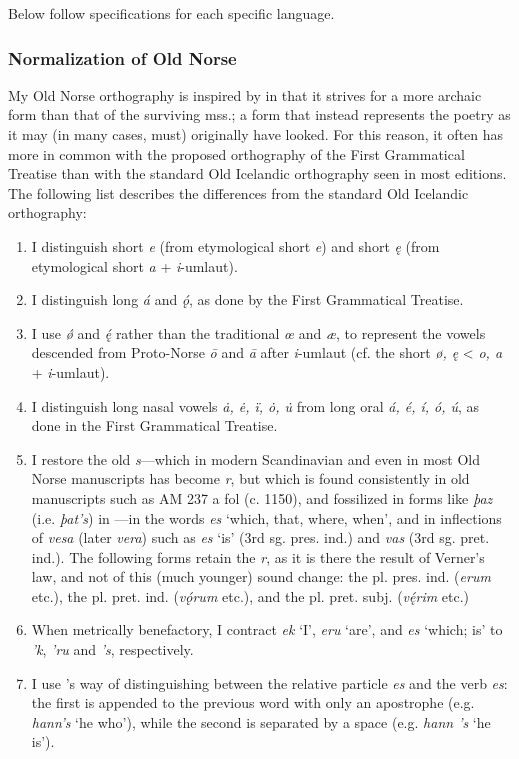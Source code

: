     Below follow specifications for each specific language.

    \subsubsection{Normalization of Old Norse}

    My Old Norse orthography is inspired by \textcite{FinnurEdda} in that it strives for a more archaic form than that of the surviving mss.; a form that instead represents the poetry as it may (in many cases, must) originally have looked. For this reason, it often has more in common with the proposed orthography of the First Grammatical Treatise than with the standard Old Icelandic orthography seen in most editions. The following list describes the differences from the standard Old Icelandic orthography:

    \begin{enumerate}
    \item I distinguish short \emph{e} (from etymological short \emph{e}) and short \emph{ę} (from etymological short \emph{a} + \emph{i}-umlaut).
    \item I distinguish long \emph{á} and \emph{ǫ́}, as done by the First Grammatical Treatise.
    \item I use \emph{ǿ} and \emph{ę́} rather than the traditional \emph{œ} and \emph{æ}, to represent the vowels descended from Proto-Norse \emph{ō} and \emph{ā} after \emph{i}-umlaut (cf. the short \emph{ø, ę} < \emph{o, a} + \emph{i}-umlaut).
    \item I distinguish long nasal vowels \emph{ȧ, ė, ï, ȯ, u̇} from long oral \emph{á, é, í, ó, ú}, as done in the First Grammatical Treatise.
    \item I restore the old \emph{s}—which in modern Scandinavian and even in most Old Norse manuscripts has become \emph{r}, but which is found consistently in old manuscripts such as AM 237 a fol (c. 1150), and fossilized in forms like \emph{þaz} (i.e. \emph{þat’s}) in \Regius—in the words \emph{es} ‘which, that, where, when’, and in inflections of \emph{vesa} (later \emph{vera}) such as \emph{es} ‘is’ (3rd sg. pres. ind.) and \emph{vas} (3rd sg. pret. ind.). The following forms retain the \emph{r}, as it is there the result of Verner’s law, and not of this (much younger) sound change: the pl. pres. ind. (\emph{erum} etc.), the pl. pret. ind. (\emph{vǫ́rum} etc.), and the pl. pret. subj. (\emph{vę́rim} etc.)
    \item When metrically benefactory, I contract \emph{ek} ‘I’, \emph{eru} ‘are’, and \emph{es} ‘which; is’ to \emph{’k}, \emph{’ru} and \emph{’s}, respectively.
    \item I use \textcite{FinnurEdda}’s way of distinguishing between the relative particle \emph{es} and the verb \emph{es}: the first is appended to the previous word with only an apostrophe (e.g. \emph{hann’s} ‘he who’), while the second is separated by a space (e.g. \emph{hann ’s} ‘he is’).
    \end{enumerate}

